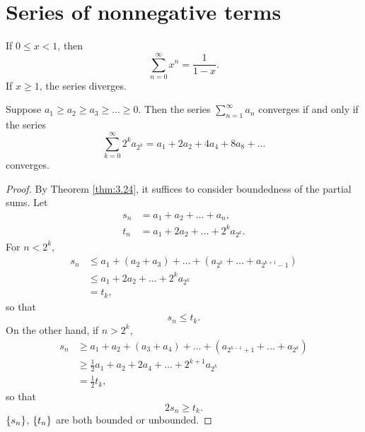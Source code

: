 \section{Series of nonnegative terms}

\begin{thm}
    \label{thm:3.26}
    If $0 \leq x < 1$, then
    \begin{equation*}
        \sum_{n=0}^{\infty} x^n = \frac{1}{1-x}.
    \end{equation*}
    If $x \geq 1$, the series diverges. 
\end{thm}




\begin{thm}
    \label{thm:3.27 Cauchy}
    Suppose $a_1 \geq a_2 \geq a_3 \geq \dots \geq 0$.
    Then the series $\sum_{n=1}^{\infty}a_n$ converges if and only if the series
    \begin{equation}
        \sum_{k=0}^{\infty} 2^k a_{2^k}
        = a_1 + 2 a_2 + 4 a_4 + 8 a_8 + \dots
    \end{equation}
    converges.
\end{thm}

\begin{proof}
    By Theorem \ref{thm:3.24}, it suffices to consider boundedness of the partial sums.
    Let
    \begin{align*}
        s_n &= a_1 + a_2 + \dots + a_n, \\
        t_n &= a_1 + 2 a_2 + \dots + 2^{k} a_{2^k}.
    \end{align*}
    For $n < 2^k$,
    \begin{align*}
        s_n 
        &\leq a_1 + (a_2 + a_3) + \dots + (a_{2^k}+\dots+a_{2^{k+1}-1}) \\
        &\leq a_1 + 2a_2 + \dots + 2^k a_{2^k} \\
        &= t_k,
    \end{align*}
    so that
    \begin{equation}
        \label{eq:3-8}
        s_n \leq t_k.
    \end{equation}
    On the other hand, if $n > 2^k$,
    \begin{align*}
        s_n 
        &\geq a_1 + a_2 + (a_3 + a_4) + \dots + (a_{2^{k-1}+1}+\dots+a_{2^{k}}) \\
        &\geq \frac{1}{2}a_1 + a_2 + 2 a_4 + \dots + 2^{k+1} a_{2^k} \\
        &= \frac{1}{2}t_k,
    \end{align*}
    so that
    \begin{equation}
        \label{eq:3-9}
        2 s_n \geq t_k.
    \end{equation}
    $\protect\{s_n\}$,
    $\protect\{t_n\}$ are both bounded or unbounded.
\end{proof}